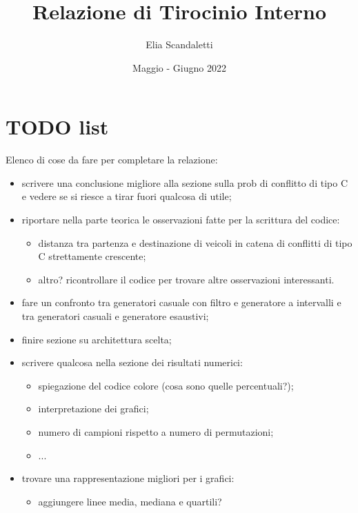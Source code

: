 

\title{Relazione di Tirocinio Interno}
\author{Elia Scandaletti}
\date{Maggio - Giugno 2022}



\maketitle
\tableofcontents

\section*{TODO list}
Elenco di cose da fare per completare la relazione:
\begin{itemize}
    \item scrivere una conclusione migliore alla sezione sulla prob di conflitto di tipo C e vedere se si riesce a tirar fuori qualcosa di utile;
    \item riportare nella parte teorica le osservazioni fatte per la scrittura del codice:
    \begin{itemize}
        \item distanza tra partenza e destinazione di veicoli in catena di conflitti di tipo C strettamente crescente;
        \item altro? ricontrollare il codice per trovare altre osservazioni interessanti.
    \end{itemize}
    \item fare un confronto tra generatori casuale con filtro e generatore a intervalli e tra generatori casuali e generatore esaustivi;
    \item finire sezione su architettura scelta;
    \item scrivere qualcosa nella sezione dei risultati numerici:
    \begin{itemize}
        \item spiegazione del codice colore (cosa sono quelle percentuali?);
        \item interpretazione dei grafici;
        \item numero di campioni rispetto a numero di permutazioni;
        \item ...
    \end{itemize}
    \item trovare una rappresentazione migliori per i grafici:
    \begin{itemize}
        \item aggiungere linee media, mediana e quartili?
    \end{itemize}
\end{itemize}

